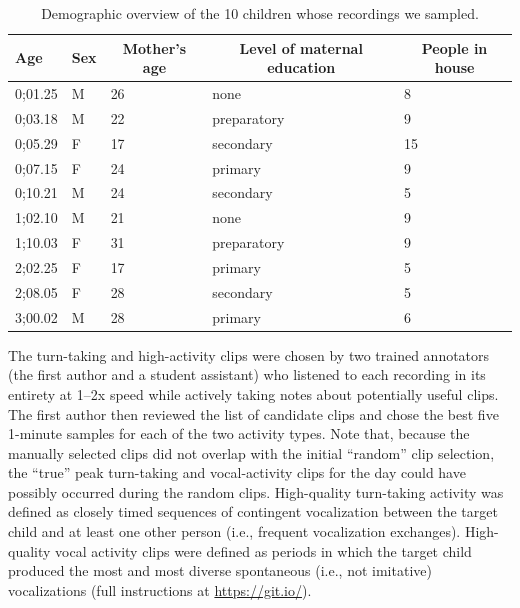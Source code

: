 \documentclass[floatsintext,man]{apa6}
\theoremstyle{definition}
\theoremstyle{definition}
\theoremstyle{definition}
\theoremstyle{remark}
\begin{document}
\begin{table}[tbp]
\begin{center}
\begin{threeparttable}
\caption{\label{tab:tab1}Demographic overview of the 10 children whose recordings we sampled.}
\begin{tabular}{lllll}
\toprule
Age & \multicolumn{1}{c}{Sex} & \multicolumn{1}{c}{Mother's age} & \multicolumn{1}{c}{Level of maternal education} & \multicolumn{1}{c}{People in house}\\
\midrule
0;01.25 & M & 26 & none & 8\\
0;03.18 & M & 22 & preparatory & 9\\
0;05.29 & F & 17 & secondary & 15\\
0;07.15 & F & 24 & primary & 9\\
0;10.21 & M & 24 & secondary & 5\\
1;02.10 & M & 21 & none & 9\\
1;10.03 & F & 31 & preparatory & 9\\
2;02.25 & F & 17 & primary & 5\\
2;08.05 & F & 28 & secondary & 5\\
3;00.02 & M & 28 & primary & 6\\
\bottomrule
\end{tabular}
\end{threeparttable}
\end{center}
\end{table}

The turn-taking and high-activity clips were chosen by two trained
annotators (the first author and a student assistant) who listened to
each recording in its entirety at 1--2x speed while actively taking
notes about potentially useful clips. The first author then reviewed the
list of candidate clips and chose the best five 1-minute samples for
each of the two activity types. Note that, because the manually selected
clips did not overlap with the initial \enquote{random} clip selection,
the \enquote{true} peak turn-taking and vocal-activity clips for the day
could have possibly occurred during the random clips. High-quality
turn-taking activity was defined as closely timed sequences of
contingent vocalization between the target child and at least one other
person (i.e., frequent vocalization exchanges). High-quality vocal
activity clips were defined as periods in which the target child
produced the most and most diverse spontaneous (i.e., not imitative)
vocalizations (full instructions at \url{https://git.io/}).
\end{document}
